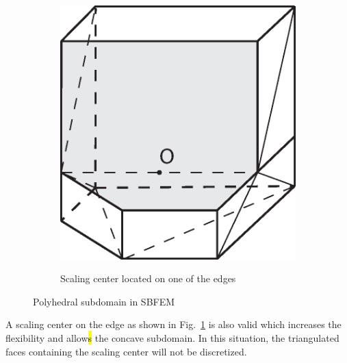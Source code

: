 \begin{figure}
\begin{subfigure}[b]{0.48\linewidth}
{            \includegraphics{octree/images/sbfem3d_b.eps}
        }
        \caption{Scaling center located on one of the edges}
        \label{oct_fig:sbfem_intro_b}
    \end{subfigure}
    \caption[Polyhedral SBFEM subdomain in 3D]{Polyhedral subdomain in SBFEM}
    \label{oct_fig:sbfem_intro}
\end{figure}
%
A scaling center on the edge as shown in Fig.~\ref{oct_fig:sbfem_intro_b} is also valid which increases the flexibility and allow\hl{s} the concave subdomain.
In this situation, the triangulated faces containing the scaling center will not be discretized.

